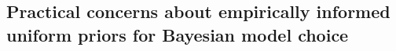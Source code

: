 

\subsection*{Practical concerns about empirically informed uniform priors for
    Bayesian model choice}

